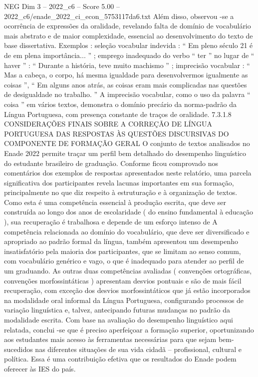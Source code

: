 \begin{textsample}{NEG Dim 3 – 2022\_c6 – Score 5.00 – 2022\_c6/enade\_2022\_ci\_econ\_5753117da6.txt}
Além disso, observou -se a ocorrência de expressões da oralidade, revelando falta de domínio de vocabulário mais abstrato e de maior complexidade, essencial ao desenvolvimento do texto de base dissertativa.
Exemplos : seleção vocabular indevida : “ Em pleno século 21 é de em plena importância... ” ; emprego inadequado do verbo “ ter ” no lugar de “ haver ” : “ Durante a história, teve muito machismo ” ; imprecisão vocabular : “ Mas a cabeça, o corpo, há mesma igualdade para desenvolvermos igualmente as coisas ”, “ Em alguns anos atrás, as coisas eram mais complicadas nas questões de desigualdade no trabalho. ” A imprecisão vocabular, como o uso da palavra “ coisa ” em vários textos, demonstra o domínio precário da norma-padrão da Língua Portuguesa, com presença constante de traços de oralidade. 7.3.1.8 CONSIDERAÇÕES FINAIS SOBRE A CORREÇÃO DE LÍNGUA PORTUGUESA DAS RESPOSTAS ÀS QUESTÕES DISCURSIVAS DO COMPONENTE DE FORMAÇÃO GERAL O conjunto de textos analisados no Enade 2022 permite traçar um perfil bem detalhado do desempenho linguístico do estudante brasileiro de graduação.
Conforme ficou comprovado nos comentários dos exemplos de respostas apresentados neste relatório, uma parcela significativa dos participantes revela lacunas importantes em sua formação, principalmente no que diz respeito à estruturação e à organização de textos.
Como esta é uma competência essencial à produção escrita, que deve ser construída ao longo dos anos de escolaridade ( do ensino fundamental à educação ), sua recuperação é trabalhosa e depende de um esforço intenso de A competência relacionada ao domínio do vocabulário, que deve ser diversificado e apropriado ao padrão formal da língua, também apresentou um desempenho insatisfatório pela maioria dos participantes, que se limitam ao senso comum, com vocabulário genérico e vago, o que é inadequado para atender ao perfil de um graduando.
As outras duas competências avaliadas ( convenções ortográficas, convenções morfossintáticas ) apresentam desvios pontuais e são de mais fácil recuperação, com exceção dos desvios morfossintáticos que já estão incorporados na modalidade oral informal da Língua Portuguesa, configurando processos de variação linguística e, talvez, antecipando futuras mudanças no padrão da modalidade escrita.
Com base na avaliação do desempenho linguístico aqui relatada, conclui -se que é preciso aperfeiçoar a formação superior, oportunizando aos estudantes mais acesso às ferramentas necessárias para que sejam bem-sucedidos nas diferentes situações de sua vida cidadã – profissional, cultural e política.
Essa é uma contribuição efetiva que os resultados do Enade podem oferecer às IES do país.

\end{textsample}
